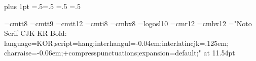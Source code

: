 %



\pdffalse \dvipdffalse        %
\parskip=0pt plus 1pt
\parindent=18pt
\abovedisplayskip=.5\abovedisplayskip  \belowdisplayskip=.5\belowdisplayskip
\abovedisplayshortskip=.5\abovedisplayshortskip
\belowdisplayshortskip=.5\belowdisplayshortskip

\font\eighttt=cmtt8
\font\ninett=cmtt9
\font\twelvett=cmtt12
\font\eightit=cmti8
\font\eightbf=cmbx8
\font\logosl=logosl10 %
\def\slMF{{\logosl META}\-{\logosl FONT}}
\font\latinauthorfont=cmr12
\font\latinchapterfont=cmbx12
\sethangulfont\twelvebd="Noto Serif CJK KR Bold:%
  language=KOR;script=hang;interhangul=-0.04em;interlatincjk=.125em;%
  charraise=-0.06em;+compresspunctuations;expansion=default;" at 11.54pt
\def\authorfont{\latinauthorfont\twelvemj}
\def\chapterfont{\latinchapterfont\twelvebd}

\def\cw#1{{\tt #1}}
\def\bs{\char92 }                              %
\def\lb{\char123 }\def\rb{\char125 }           %

\def\chapter#1{\penalty-500\bigskip
  \centerline{\chapterfont\def\.##1{{\twelvett##1}}#1}\nobreak\vskip 6pt}
\def\section#1{\medskip\noindent{\bf #1.}\enspace\ignorespaces}

